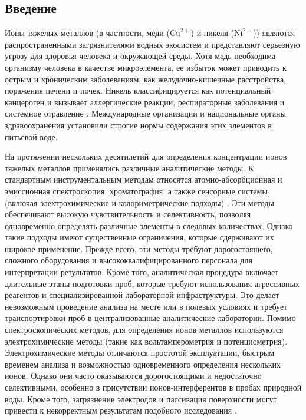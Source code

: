 \documentclass[a4paper, 12pt]{article}
\begin{document}


\ToC{}

\begin{onehalfspace}
\section*{Введение}

	Ионы тяжелых металлов (в частности, меди ($\text{Cu}^{2+}$) и никеля ($\text{Ni}^{2+}$)) являются распространенными загрязнителями водных экосистем и представляют серьезную угрозу для здоровья человека и окружающей среды.
	Хотя медь необходима организму человека в качестве микроэлемента, ее избыток может приводить к острым и хроническим заболеваниям, как желудочно-кишечные расстройства, поражения печени и почек.
	Никель классифицируется как потенциальный канцероген и вызывает аллергические реакции, респираторные заболевания и системное отравление \cite{Yang:2014}.
	Международные организации и национальные органы здравоохранения установили строгие нормы содержания этих элементов в питьевой воде.

	На протяжении нескольких десятилетий для определения концентрации ионов тяжелых металлов применялись различные аналитические методы.
	К стандартным инструментальным методам относятся атомно-абсорбционная и эмиссионная спектроскопия, хроматография, а также сенсорные системы (включая электрохимические и колориметрические подходы) \cite{Elkhatat:2021, Zhou:2024}.
	Эти методы обеспечивают высокую чувствительность и селективность, позволяя одновременно определять различные элементы в следовых количествах.
	Однако такие подходы имеют существенные ограничения, которые сдерживают их широкое применение.
	Прежде всего, эти методы требуют дорогостоящего, сложного оборудования и высококвалифицированного персонала для интерпретации результатов.
	Кроме того, аналитическая процедура включает длительные этапы подготовки проб, которые требуют использования агрессивных реагентов и специализированной лабораторной инфраструктуры.
	Это делает невозможным проведение анализа на месте или в полевых условиях и требует транспортировки проб в централизованные аналитические лаборатории.
	Помимо спектроскопических методов, для определения ионов металлов используются электрохимические методы (такие как вольтамперометрия и потенциометрия).
	Электрохимические методы отличаются простотой эксплуатации, быстрым временем анализа и возможностью одновременного определения нескольких ионов.
	Однако они часто оказываются дорогостоящими и недостаточно селективными, особенно в присутствии ионов-интерферентов в пробах природной воды.
	Кроме того, загрязнение электродов и пассивация поверхности могут привести к некорректным результатам подобного исследования \cite{Bond:1983}.


\end{onehalfspace}
\end{document}
